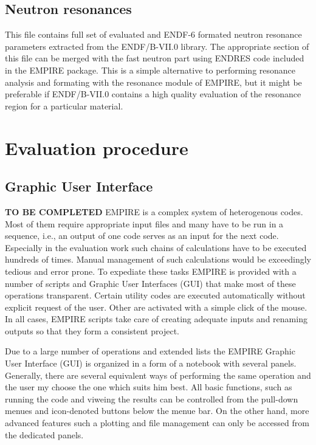 \subsection{Neutron resonances}

This file contains full set of evaluated and ENDF-6 formated neutron
resonance parameters extracted from the ENDF/B-VII.0 library. The
appropriate section of this file can be merged with the fast neutron part
using ENDRES code included in the EMPIRE package. This is a simple
alternative to performing resonance analysis and formating with the
resonance module of EMPIRE, but it might be preferable if ENDF/B-VII.0
contains a high quality evaluation of the resonance region for a particular
material.


\section{Evaluation procedure}

\subsection{Graphic User Interface}

\textbf{TO BE COMPLETED} EMPIRE is a complex system of heterogenous codes.
Most of them require appropriate input files and many have to be run in a
sequence, i.e., an output of one code serves as an input for the next code.
Especially in the evaluation work such chains of calculations have to be
executed hundreds of times. Manual management of such calculations would be
exceedingly tedious and error prone. To expediate these tasks EMPIRE is
provided with a number of scripts and Graphic User Interfaces (GUI) that
make most of these operations transparent. Certain utility codes are
executed automatically without explicit request of the user. Other are
activated with a simple click of the mouse. In all cases, EMPIRE scripts
take care of creating adequate inputs and renaming outputs so that they form
a consistent project.

Due to a large number of operations and extended lists the EMPIRE Graphic
User Interface (GUI) is organized in a form of a notebook with several
panels. Generally, there are several equivalent ways of performing the same
operation and the user my choose the one which suits him best. All basic
functions, such as running the code and viweing the results can be
controlled from the pull-down menues and icon-denoted buttons below the
menue bar. On the other hand, more advanced features such a plotting and
file management can only be accessed from the dedicated panels.

